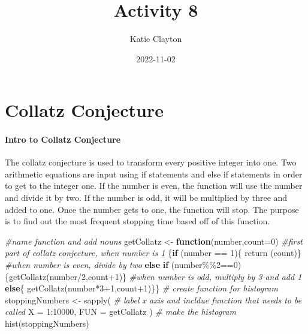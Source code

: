 \documentclass[
]{article}
\title{Activity 8}
\author{Katie Clayton}
\date{2022-11-02}
\newenvironment{Shaded}{\begin{snugshade}}{\end{snugshade}}
\newcommand{\AttributeTok}[1]{\textcolor[rgb]{0.77,0.63,0.00}{#1}}
\newcommand{\CommentTok}[1]{\textcolor[rgb]{0.56,0.35,0.01}{\textit{#1}}}
\newcommand{\ControlFlowTok}[1]{\textcolor[rgb]{0.13,0.29,0.53}{\textbf{#1}}}
\newcommand{\DecValTok}[1]{\textcolor[rgb]{0.00,0.00,0.81}{#1}}
\newcommand{\FunctionTok}[1]{\textcolor[rgb]{0.00,0.00,0.00}{#1}}
\newcommand{\NormalTok}[1]{#1}
\newcommand{\OtherTok}[1]{\textcolor[rgb]{0.56,0.35,0.01}{#1}}
\newcommand{\SpecialCharTok}[1]{\textcolor[rgb]{0.00,0.00,0.00}{#1}}
\begin{document}
\maketitle

\hypertarget{collatz-conjecture}{%
\section{\texorpdfstring{\textbf{Collatz
Conjecture}}{Collatz Conjecture}}\label{collatz-conjecture}}

\hypertarget{intro-to-collatz-conjecture}{%
\paragraph{Intro to Collatz
Conjecture}\label{intro-to-collatz-conjecture}}

The collatz conjecture is used to transform every positive integer into
one. Two arithmetic equations are input using if statements and else if
statements in order to get to the integer one. If the number is even,
the function will use the number and divide it by two. If the number is
odd, it will be multiplied by three and added to one. Once the number
gets to one, the function will stop. The purpose is to find out the most
frequent stopping time based off of this function.

\begin{Shaded}
\begin{Highlighting}[]
\CommentTok{\#name function and add nouns}
\NormalTok{getCollatz }\OtherTok{\textless{}{-}} \ControlFlowTok{function}\NormalTok{(number,}\AttributeTok{count=}\DecValTok{0}\NormalTok{)}
  \CommentTok{\#first part of collatz conjecture, when number is 1}
\NormalTok{\{}\ControlFlowTok{if}\NormalTok{ (number }\SpecialCharTok{==} \DecValTok{1}\NormalTok{)\{}
  \FunctionTok{return}\NormalTok{ (count)\}}
  \CommentTok{\#when number is even, divide by two}
  \ControlFlowTok{else} \ControlFlowTok{if}\NormalTok{ (number}\SpecialCharTok{\%\%}\DecValTok{2}\SpecialCharTok{==}\DecValTok{0}\NormalTok{)}
\NormalTok{    \{}\FunctionTok{getCollatz}\NormalTok{(number}\SpecialCharTok{/}\DecValTok{2}\NormalTok{,count}\SpecialCharTok{+}\DecValTok{1}\NormalTok{)\}}
  \CommentTok{\#when number is odd, multiply by 3 and add 1}
  \ControlFlowTok{else}\NormalTok{\{}
    \FunctionTok{getCollatz}\NormalTok{(number}\SpecialCharTok{*}\DecValTok{3}\SpecialCharTok{+}\DecValTok{1}\NormalTok{,count}\SpecialCharTok{+}\DecValTok{1}\NormalTok{)\}\}}
\CommentTok{\# create function for histogram}
\NormalTok{stoppingNumbers }\OtherTok{\textless{}{-}} \FunctionTok{sapply}\NormalTok{(}
\CommentTok{\# label x axis and incldue function that needs to be called}
\AttributeTok{X =} \DecValTok{1}\SpecialCharTok{:}\DecValTok{10000}\NormalTok{,}
\AttributeTok{FUN =}\NormalTok{ getCollatz}
\NormalTok{)}
\CommentTok{\# make the histogram}
\FunctionTok{hist}\NormalTok{(stoppingNumbers)}
\end{Highlighting}
\end{Shaded}
\end{document}
